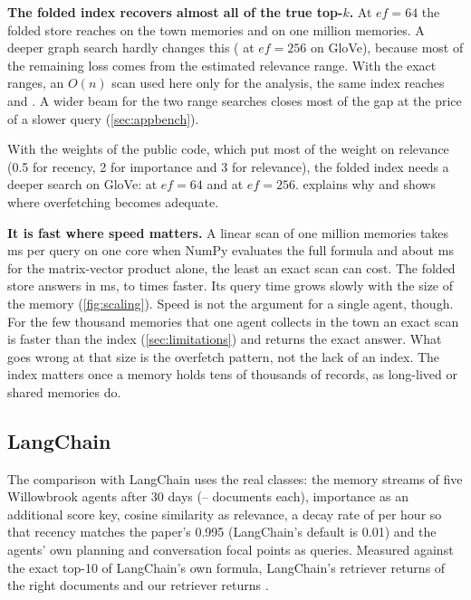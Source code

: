 \documentclass[11pt,a4paper]{article}
\begin{document}
\textbf{The folded index recovers almost all of the true top-$k$.} At $ef=64$ the folded store reaches \TwOursRecall{} on the town memories and \GlOursRecallOneM{} on one million memories. A deeper graph search hardly changes this (\GlOursRecallDeep{} at $ef=256$ on GloVe), because most of the remaining loss comes from the estimated relevance range. With the exact ranges, an $O(n)$ scan used here only for the analysis, the same index reaches \TwOursExactNorm{} and \GlOursExactNorm{}. A wider beam for the two range searches closes most of the gap at the price of a slower query (\cref{sec:appbench}).

With the weights of the public code, which put most of the weight on relevance (0.5 for recency, 2 for importance and 3 for relevance), the folded index needs a deeper search on GloVe: \GlCodeRecall{} at $ef=64$ and \GlCodeRecallDeep{} at $ef=256$.  explains why and shows where overfetching becomes adequate.

\textbf{It is fast where speed matters.} A linear scan of one million memories takes \GlExactMsOneM{} ms per query on one core when NumPy evaluates the full formula and about \GlExactMvMsOneM{} ms for the matrix-vector product alone, the least an exact scan can cost. The folded store answers in \GlOursMsOneM{} ms, \GlSpeedupMv{} to \GlSpeedupOneM{} times faster. Its query time grows slowly with the size of the memory (\cref{fig:scaling}). Speed is not the argument for a single agent, though. For the few thousand memories that one agent collects in the town an exact scan is faster than the index (\cref{sec:limitations}) and returns the exact answer. What goes wrong at that size is the overfetch pattern, not the lack of an index. The index matters once a memory holds tens of thousands of records, as long-lived or shared memories do.

\subsection{LangChain}
\label{sec:langchain}

The comparison with LangChain uses the real classes: the memory streams of five Willowbrook agents after 30 days (\LcMinN{}--\LcMaxN{} documents each), importance as an additional score key, cosine similarity as relevance, a decay rate of \LcDecay{} per hour so that recency matches the paper's 0.995 (LangChain's default is 0.01) and the agents' own planning and conversation focal points as queries. Measured against the exact top-10 of LangChain's own formula, LangChain's retriever returns \LcRecall{} of the right documents and our retriever returns \LcOursRecall{}.
\end{document}
